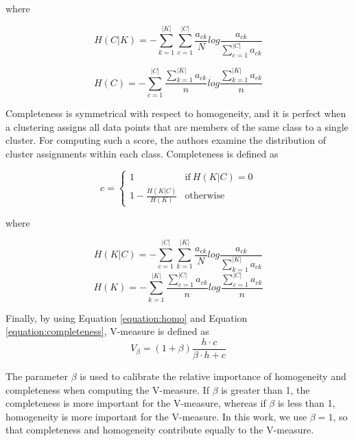 where

\begin{equation}
    H(C|K) =  -\sum_{k=1}^{|K|}{\sum_{c=1}^{|C|}{\frac{a_{ck}}{N}log\frac{a_{ck}}{\sum_{c=1}^{|C|}{a_{ck}}}}}
\end{equation}

\vspace{1em}

\begin{equation}
    H(C) = -\sum_{c=1}^{|C|}{  \frac{\sum_{k=1}^{|K|}a_{ck}}{n}log \frac{\sum_{k=1}^{|K|}a_{ck}}{n} }
\end{equation}
\vspace{1em}

Completeness is symmetrical with respect to homogeneity, and it is perfect when a clustering assigns all data points that are members of the same class to a single cluster. 
For computing such a score, the authors examine the distribution of cluster assignments within each class.
Completeness is defined as 

\begin{equation}
\label{equation:completeness}
    c = \begin{cases} 1 & \text{if}\ H(K|C) = 0 \\1-\frac{H(K|C)}{H(K)} & \text{otherwise}\end{cases}
\end{equation}

where

\begin{equation}
    H(K|C) =  -\sum_{c=1}^{|C|}{\sum_{k=1}^{|K|}{\frac{a_{ck}}{N}log\frac{a_{ck}}{\sum_{k=1}^{|K|}{a_{ck}}}}}
\end{equation}
\vspace{2em}
\begin{equation}
    H(K) = -\sum_{k=1}^{|K|}{  \frac{\sum_{c=1}^{|C|}a_{ck}}{n}log \frac{\sum_{c=1}^{|C|}a_{ck}}{n} }
\end{equation}
\vspace{1em}

Finally, by using Equation \ref{equation:homo} and Equation \ref{equation:completeness}, V-measure is defined as 
\begin{equation}
    V_{\beta} = (1+\beta)\frac{h\cdot c}{\beta\cdot{h+c}}
\end{equation}

The parameter $\beta$ is used to calibrate the relative importance of homogeneity and completeness when computing the V-measure. If $\beta$ is greater than 1, the completeness is more important for the V-measure, whereas 
if $\beta$ is less than 1, homogeneity is more important for the V-measure. 
In this work, we use $\beta = 1$, so that completeness and homogeneity contribute equally to the V-measure.

